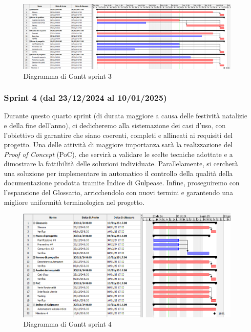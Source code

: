         \begin{figure}[h!]
            \centering
            \includegraphics[scale = 0.3]{template/images/gantt3.png}
            \caption{Diagramma di Gantt sprint 3}
            \label{fig:3.3} %
        \end{figure}

        \subsubsection{Sprint 4 (dal 23/12/2024 al 10/01/2025)}
        Durante questo quarto sprint (di durata maggiore a causa delle festività natalizie e della fine dell'anno), ci dedicheremo alla sistemazione dei casi d'uso, con l'obiettivo di garantire che siano coerenti, completi e allineati ai requisiti del progetto. 
        Una delle attività di maggiore importanza sarà la realizzazione del \textit{Proof of Concept} (PoC), che servirà a validare le scelte tecniche adottate e a dimostrare la fattibilità delle soluzioni individuate. 
        Parallelamente, si cercherà una soluzione per implementare in automatico il controllo della qualità della documentazione prodotta tramite Indice di Gulpease. 
        Infine, proseguiremo con l'espansione del Glossario, arricchendolo con nuovi termini e garantendo una migliore uniformità terminologica nel progetto.

        \begin{figure}[h!]
            \centering
            \includegraphics[scale = 0.45]{template/images/gantt4.png}
            \caption{Diagramma di Gantt sprint 4}
            \label{fig:3.4} %
        \end{figure}

